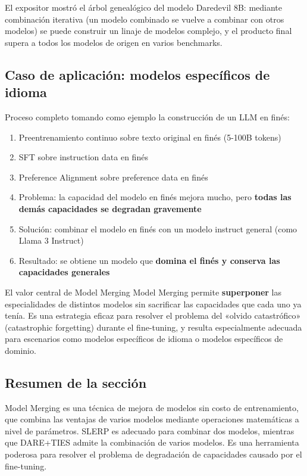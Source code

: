 El expositor mostró el árbol genealógico del modelo Daredevil 8B: mediante combinación iterativa (un modelo combinado se vuelve a combinar con otros modelos) se puede construir un linaje de modelos complejo, y el producto final supera a todos los modelos de origen en varios benchmarks.

\subsection{Caso de aplicación: modelos específicos de idioma}

Proceso completo tomando como ejemplo la construcción de un LLM en finés:

\begin{enumerate}
    \item Preentrenamiento continuo sobre texto original en finés (5-100B tokens)
    \item SFT sobre instruction data en finés
    \item Preference Alignment sobre preference data en finés
    \item Problema: la capacidad del modelo en finés mejora mucho, pero \textbf{todas las demás capacidades se degradan gravemente}
    \item Solución: combinar el modelo en finés con un modelo instruct general (como Llama 3 Instruct)
    \item Resultado: se obtiene un modelo que \textbf{domina el finés y conserva las capacidades generales}
\end{enumerate}

\begin{importantbox}{El valor central de Model Merging}
Model Merging permite \textbf{superponer} las especialidades de distintos modelos sin sacrificar las capacidades que cada uno ya tenía. Es una estrategia eficaz para resolver el problema del «olvido catastrófico» (catastrophic forgetting) durante el fine-tuning, y resulta especialmente adecuada para escenarios como modelos específicos de idioma o modelos específicos de dominio.
\end{importantbox}

\subsection{Resumen de la sección}

Model Merging es una técnica de mejora de modelos sin costo de entrenamiento, que combina las ventajas de varios modelos mediante operaciones matemáticas a nivel de parámetros. SLERP es adecuado para combinar dos modelos, mientras que DARE+TIES admite la combinación de varios modelos. Es una herramienta poderosa para resolver el problema de degradación de capacidades causado por el fine-tuning.

\newpage
